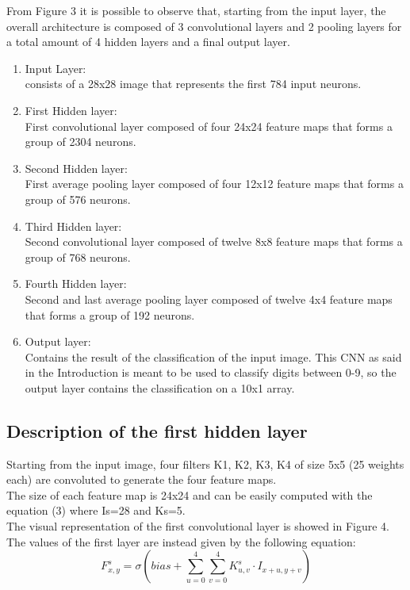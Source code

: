 \documentclass[a4paper]{report}
\begin{document}
From Figure 3 it is possible to observe that, starting from the input layer, the overall architecture is composed of 3 convolutional layers and 2 pooling layers for a total amount of 4 hidden layers and a final output layer.
\begin{enumerate}
\item Input Layer: \\
consists of a 28x28 image that represents the first 784 input neurons.
\item First Hidden layer: \\
First convolutional layer composed of four 24x24 feature maps that forms a group of 2304 neurons.
\item Second Hidden layer:\\
First average pooling layer composed of four 12x12 feature maps that forms a group of 576 neurons.
\item Third Hidden layer:\\
Second convolutional layer composed of twelve 8x8 feature maps that forms a group of 768 neurons.
\item Fourth Hidden layer:\\
Second and last average pooling layer composed of twelve 4x4 feature maps that forms a group of 192 neurons.
\item Output layer:\\
Contains the result of the classification of the input image. This CNN as said in the Introduction is meant to be used to classify digits between 0-9, so the output layer contains the classification on a 10x1 array.
\end{enumerate}


\subsection{Description of the first hidden layer}
Starting from the input image, four filters K1, K2, K3, K4 of size 5x5 (25 weights each) are convoluted to generate the four feature maps.\\
The size of each feature map is 24x24 and can be easily computed with the equation (3) where Is=28 and Ks=5.\\
The visual representation of the first convolutional layer is showed in Figure 4.\\
The values of the first layer are instead given by the following equation:
\begin{equation} 
\label{convLayer}
F^{s}_{x,y} = \sigma (bias + \sum_{u=0}^{4}\sum_{v=0}^{4}K^{s}_{u,v} \cdot I_{x+u,y+v})
 \end{equation}
\end{document}
